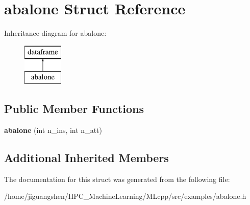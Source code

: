\hypertarget{structabalone}{\section{abalone Struct Reference}
\label{structabalone}
}
Inheritance diagram for abalone\-:\begin{figure}[H]
\begin{center}
\leavevmode
\includegraphics[height=2.000000cm]{structabalone}
\end{center}
\end{figure}
\subsection*{Public Member Functions}
\begin{DoxyCompactItemize}
\item 
\hypertarget{structabalone_a77c61f7a662ba99ce5f6916f7f6f0ca5}{{\bfseries abalone} (int n\-\_\-ins, int n\-\_\-att)}\label{structabalone_a77c61f7a662ba99ce5f6916f7f6f0ca5}

\end{DoxyCompactItemize}
\subsection*{Additional Inherited Members}


The documentation for this struct was generated from the following file\-:\begin{DoxyCompactItemize}
\item 
/home/jiguangshen/\-H\-P\-C\-\_\-\-Machine\-Learning/\-M\-Lcpp/src/examples/abalone.\-h\end{DoxyCompactItemize}
